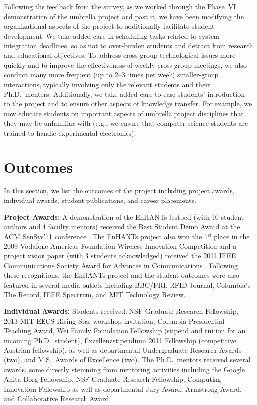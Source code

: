 \documentclass[journal,twopages]{IEEEtran}
\newcommand{\makered}[1]{\color{black}#1\color{black}}
\begin{document}
\makered{Following the feedback from the survey, as we worked through the Phase~VI demonstration of the umbrella project and past it, we have been modifying the organizational aspects of the project to additionally facilitate student development. We take added care in scheduling tasks related to system integration deadlines, so as not to over-burden students and detract from research and educational objectives.
To address cross-group technological issues more quickly and to improve the effectiveness of weekly cross-group meetings, we also conduct many more frequent (up to 2--3 times per week) smaller-group interactions, typically involving only the relevant students and their Ph.D.\ mentors. Additionally, we take added care to ease students' introduction to the project and to ensure other aspects of knowledge transfer. For example, we now educate students on important aspects of umbrella project disciplines that they may be unfamiliar with (e.g., we ensure that computer science students are trained to handle experimental electronics).}



\section{Outcomes}\label{sect:outcomes}
In this section, we list the outcomes of the project including project awards, individual awards, student publications, and career placements.

\noindent\textbf{Project Awards:} A demonstration of the
EnHANTs testbed (with 10 student authors and 4 faculty mentors) received
the Best Student Demo Award at the ACM SenSys'11 conference
\cite{SenSys2011Demo}. The EnHANTs project also won the 1$^\textrm{st}$
place in the 2009 Vodafone Americas Foundation Wireless Innovation
Competition and a project vision paper (with 3 students acknowledged)
received the 2011 IEEE Communications Society Award for Advances in
Communications \cite{Gorlatova_Enhants_wircom}. Following these
recognitions, the EnHANTs project and the student outcomes were also
featured in several media outlets including BBC/PRI, RFID Journal,
Columbia's The Record, IEEE Spectrum, and MIT Technology Review.

\noindent\textbf{Individual Awards:} Students received: 
NSF Graduate Research Fellowship, 2013 MIT EECS Rising Star workshop
invitation, Columbia Presidential Teaching Award, Wei Family Foundation
Fellowship (stipend and tuition for an incoming Ph.D.\ student),
Exzellenzstipendium 2011 Fellowship (competitive Austrian fellowship),
as well as departmental Undergraduate Research Awards (two), and M.S.\ Awards of
Excellence (two). The Ph.D.\ mentors received several awards, some 
directly stemming from mentoring activities including the Google
Anita Borg Fellowship, NSF Graduate Research Fellowship, Computing
Innovation Fellowship as well as departmental Jury Award, Armstrong
Award, and Collaborative Research Award. 
\end{document}
